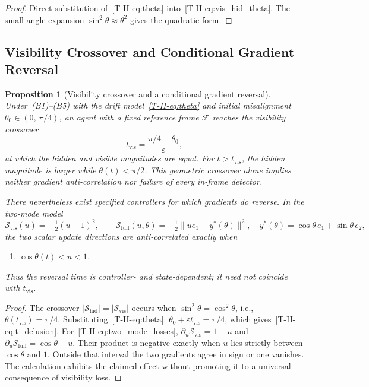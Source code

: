 \documentclass[12pt,a4paper,openany]{book}
\newtheorem{proposition}[theorem]{Proposition}
\begin{document}
\begin{proof}
Direct substitution of~\eqref{T-II-eq:theta}
into~\eqref{T-II-eq:vis_hid_theta}.
The small-angle expansion $\sin^2\theta\approx\theta^2$ gives the
quadratic form.
\end{proof}

\subsection{Visibility Crossover and Conditional Gradient Reversal}
\label{T-II-subsec:delusion}

\begin{proposition}[Visibility crossover and a conditional gradient reversal]
\label{T-II-prop:delusion_model}
Under~\textup{(B1)--(B5)} with the drift
model~\eqref{T-II-eq:theta} and initial misalignment
$\theta_0 \in (0,\,\pi/4)$, an agent with a fixed
reference frame $\mathcal{F}$ reaches the visibility crossover
\begin{equation}
\label{T-II-eq:t_delusion}
t_{\mathrm{vis}}
= \frac{\pi/4-\theta_0}{\varepsilon},
\end{equation}
at which the hidden and visible magnitudes are equal.  For
$t>t_{\mathrm{vis}}$, the hidden magnitude is larger while
$\theta(t)<\pi/2$.  This geometric crossover alone implies neither
gradient anti-correlation nor failure of every in-frame detector.

There nevertheless exist specified controllers for which gradients do
reverse.  In the two-mode model
\begin{equation}
\label{T-II-eq:two_mode_losses}
\mathcal S_{\mathrm{vis}}(u)=-\tfrac12(u-1)^2,
\qquad
\mathcal S_{\mathrm{full}}(u,\theta)
=-\tfrac12\lVert u e_1-y^*(\theta)\rVert^2,
\quad
y^*(\theta)=\cos\theta\,e_1+\sin\theta\,e_2,
\end{equation}
the two scalar update directions are anti-correlated exactly when
\begin{enumerate}
\item[] $\cos\theta(t)<u<1$.
\end{enumerate}
Thus the reversal time is controller- and state-dependent; it need not
coincide with $t_{\mathrm{vis}}$.
\end{proposition}

\begin{proof}
The crossover $|\mathcal{S}_{\mathrm{hid}}|
= |\mathcal{S}_{\mathrm{vis}}|$ occurs when
$\sin^2\theta = \cos^2\theta$, i.e.,
$\theta(t_{\mathrm{vis}}) = \pi/4$.
Substituting~\eqref{T-II-eq:theta}:
$\theta_0+\varepsilon t_{\mathrm{vis}} = \pi/4$,
which gives~\eqref{T-II-eq:t_delusion}.
For~\eqref{T-II-eq:two_mode_losses},
$\partial_u\mathcal S_{\mathrm{vis}}=1-u$ and
$\partial_u\mathcal S_{\mathrm{full}}=\cos\theta-u$.
Their product is negative exactly when $u$ lies strictly between
$\cos\theta$ and $1$.  Outside that interval the two gradients agree
in sign or one vanishes.  The calculation exhibits the claimed effect
without promoting it to a universal consequence of visibility loss.
\end{proof}
\end{document}
